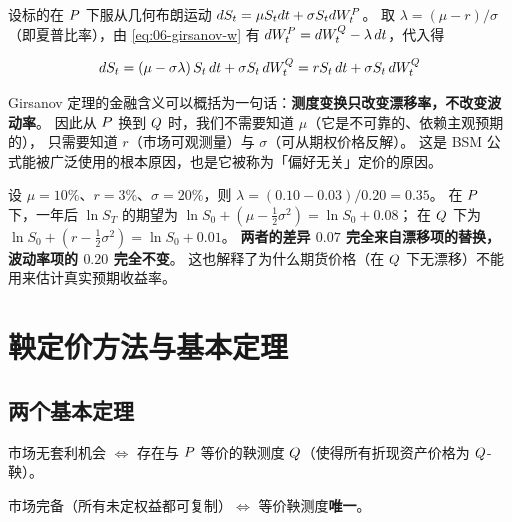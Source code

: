 设标的在 $P$ 下服从几何布朗运动 $d S_t = \mu S_td t+\sigma S_td W_t^{P}$。
取 $\lambda = (\mu-r)/\sigma$（即夏普比率），由 \cref{eq:06-girsanov-w} 有
$d W_t^{P} = d W_t^{Q}-\lambda\,d t$，代入得

\begin{equation}
  d S_t = \left(\mu-\sigma\lambda\right)S_t\,d t+\sigma S_t\,d W_t^{Q}
          = rS_t\,d t+\sigma S_t\,d W_t^{Q}
  \label{eq:06-rn-sde}
\end{equation}

\begin{keybox}
Girsanov 定理的金融含义可以概括为一句话：\textbf{测度变换只改变漂移率，不改变波动率}。
因此从 $P$ 换到 $Q$ 时，我们不需要知道 $\mu$（它是不可靠的、依赖主观预期的），
只需要知道 $r$（市场可观测量）与 $\sigma$（可从期权价格反解）。
这是 BSM 公式能被广泛使用的根本原因，也是它被称为「偏好无关」定价的原因。
\end{keybox}

\begin{example}[测度变换下的漂移修正]\label{ex:06-drift}
设 $\mu = 10\%$、$r = 3\%$、$\sigma = 20\%$，则 $\lambda = (0.10-0.03)/0.20 = 0.35$。
在 $P$ 下，一年后 $\ln S_T$ 的期望为 $\ln S_0 + (\mu-\tfrac12\sigma^2) = \ln S_0+0.08$；
在 $Q$ 下为 $\ln S_0 + (r-\tfrac12\sigma^2) = \ln S_0+0.01$。
\textbf{两者的差异 $0.07$ 完全来自漂移项的替换，波动率项的 $0.20$ 完全不变}。
这也解释了为什么期货价格（在 $Q$ 下无漂移）不能用来估计真实预期收益率。
\end{example}

\section{鞅定价方法与基本定理}

\subsection{两个基本定理}

\begin{theorem}[第一基本资产定价定理]\label{thm:06-ftap1}
市场无套利机会 $\iff$ 存在与 $P$ 等价的鞅测度 $Q$（使得所有折现资产价格为 $Q$-鞅）。
\end{theorem}

\begin{theorem}[第二基本资产定价定理]\label{thm:06-ftap2}
市场完备（所有未定权益都可复制）$\iff$ 等价鞅测度\textbf{唯一}。
\end{theorem}

